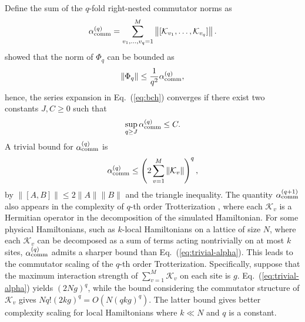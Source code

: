 \documentclass[aps,pra,reprint,groupedaddress,floatfix]{revtex4-2}
\newcommand{\eq}[1]{(\ref{eq:#1})}
\newcommand{\mc}{\mathcal}
\begin{document}
Define the sum of the $q$-fold right-nested commutator norms as
\begin{align}
\label{eq:def-comm}
 	\alpha_{\rm comm}^{(q)} =\sum_{v_1, \ldots, v_q = 1}^{M} \left\|[\mc K_{v_1}, \ldots, \mc K_{v_q}]\right\|.
\end{align}
\citet{aftab2024multi} showed that the norm of $\Phi_q$ can be bounded as
\begin{align*}
 	\|\Phi_q\|\le \frac{1}{q^2} 	\alpha_{\rm comm}^{(q)},
\end{align*}
hence, the series expansion in Eq.~\eq{bch} converges if there exist two constants $J,C\ge 0$ such that
\begin{align}
\label{eq:converg-bch}
 	\sup_{q\ge J}\alpha_{\rm comm}^{(q)} \le C.
\end{align} 
A trivial bound for $\alpha_{\rm comm}^{(q)}$ is
\begin{align}
\label{eq:trivial-alpha}
 	\alpha_{\rm comm}^{(q)} \le \left(2\sum_{v = 1}^M \|\mc K_v\|\right)^q,
\end{align}
by $\|[A,B]\|\le 2\|A\|\|B\|$ and the triangle inequality. The quantity $\alpha_{\rm comm}^{(q+1)}$ also appears in the complexity of $q$-th order Trotterization \cite{childs2021theory}, where each $\mc K_v$ is a Hermitian operator in the decomposition of the simulated Hamiltonian. For some physical Hamiltonians, such as $k$-local Hamiltonians on a lattice of size $N$, where each $\mc K_v$ can be decomposed as a sum of terms acting nontrivially on at most $k$ sites, $\alpha_{\rm comm}^{(q)}$ admits a sharper bound than Eq.~\eq{trivial-alpha}. This leads to the commutator scaling of the $q$-th order Trotterization. Specifically, suppose that the maximum interaction strength of $\sum_{v = 1}^M \mc K_v$ on each site is $g$. Eq.~\eq{trivial-alpha} yields $(2Ng)^q$, while the bound considering the commutator structure of $\mc K_v$ gives $Nq!(2kg)^q = O(N(qkg)^q)$. The latter bound gives better complexity scaling for local Hamiltonians where $k\ll N$ and $q$ is a constant. 
\end{document}
